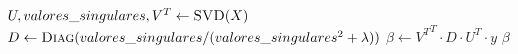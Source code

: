     \State $U, valores\_singulares, V^T \gets \Call{SVD}{X}$
    \State $D \gets \Call{Diag}{
        valores\_singulares / (valores\_singulares^2 + \lambda)
        }$
    \State $\beta \gets {V^T}^T \cdot {D} \cdot {U}^T \cdot {y}$
    \State \Return $\beta$
\EndFunction